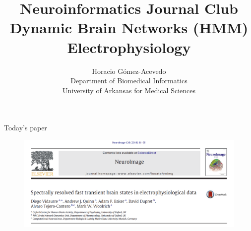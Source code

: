 \documentclass{beamer}
\title{Neuroinformatics Journal Club\\ Dynamic Brain Networks (HMM) \\ Electrophysiology}
\author{Horacio G\'omez-Acevedo\\ Department of Biomedical Informatics\\
	University of Arkansas for Medical Sciences}
\begin{document}
	\begin{frame}[plain]
		\maketitle
	\end{frame}
	
	\begin{frame}{Today's paper}
		\begin{figure}[h]
			\centering
				\includegraphics[scale=0.45]{../Figures/vidaurre_paper2.png}
		\end{figure}
	\end{frame}
	
\end{document}
